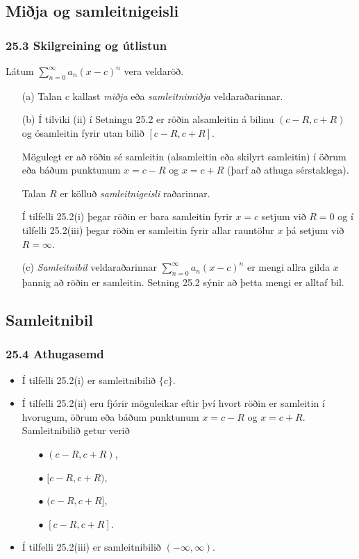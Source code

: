 \subsection[t]{Miðja og samleitnigeisli}
 \subsubsection{25.3 Skilgreining og útlistun}
Látum   $\sum_{n=0}^\infty a_n(x-c)^n$ vera veldaröð.\pause
\begin{itemize}
\item[(a)]  Talan $c$ kallast {\em miðja} eða {\em samleitnimiðja}
  veldaraðarinnar. \pause
\item[(b)]  Í tilviki (ii) í Setningu 25.2 er röðin alsamleitin á
  bilinu $(c-R, c+R)$ og ósamleitin fyrir utan bilið $[c-R, c+R]$.\pause
  
Mögulegt er að röðin sé samleitin (alsamleitin eða skilyrt
  samleitin)  í öðrum eða báðum punktunum $x=c-R$ og $x=c+R$ (þarf að
  athuga sérstaklega).  \pause

Talan $R$ er kölluð {\em samleitnigeisli}
  raðarinnar.  \pause

Í tilfelli 25.2(i) þegar röðin er bara samleitin fyrir
  $x=c$ setjum við $R=0$ \pause og í tilfelli 25.2(iii) þegar röðin er
  samleitin fyrir allar rauntölur $x$ þá setjum við $R=\infty$.\pause
\item[(c)]  {\em Samleitnibil} veldaraðarinnar $\sum_{n=0}^\infty
  a_n(x-c)^n$ er mengi allra gilda $x$ þannig að röðin er samleitin. \pause
  Setning 25.2 sýnir að þetta mengi er alltaf bil.
\end{itemize}



\subsection[t]{Samleitnibil}
\subsubsection{25.4 Athugasemd}
\begin{itemize}
\item Í tilfelli 25.2(i) er samleitnibilið $\{c\}$.\pause
\item Í tilfelli 25.2(ii) eru fjórir möguleikar eftir því hvort röðin er
samleitin í hvorugum, öðrum eða báðum punktunum $x=c-R$ og $x=c+R$.  
Samleitnibilið getur verið \pause
\begin{itemize}
 \item[$\bullet$] $(c-R, c+R)$,\pause
\item[$\bullet$] $[c-R, c+R)$,\pause
\item[$\bullet$]  $(c-R, c+R]$, \pause 
\item[$\bullet$] $[c-R, c+R]$.\pause
\end{itemize}
\item Í tilfelli 25.2(iii) er samleitnibilið $(-\infty, \infty)$.
\end{itemize}




